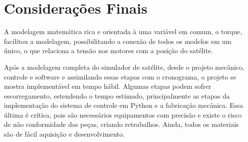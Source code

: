 \chapter[Considerações Finais]{Considerações Finais}

A modelagem matemática rica e orientada à uma variável em comum, o torque, facilitou a modelagem, possibilitando a conexão de todos os modelos em um único, o que relaciona a tensão nos motores com a posição do satélite. 

Após a modelagem completa do simulador de satélite, desde o projeto mecânico, controle e software e assimilando essas etapas com o cronograma, o projeto se mostra implementável em tempo hábil. Algumas etapas podem sofrer escorregamento, estendendo o tempo estimado, principalmente as etapas da implementação do sistema de controle em Python e a fabricação mecânica. Essa última é crítica, pois são necessários equipamentos com precisão e existe o risco de não conformidade das peças, criando retrabalhos. Ainda, todos os materiais são de fácil aquisição e desenvolvimento.

